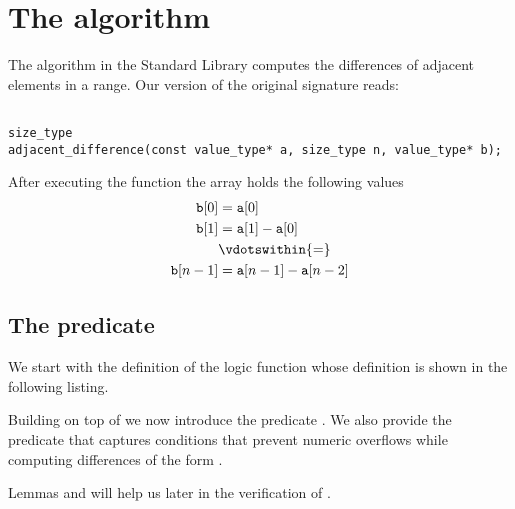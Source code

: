 
\section{The \adjacentdifference algorithm}

The \adjacentdifference algorithm in the \cxx Standard Library \cite[\S 29.8.11]{cxx-17-draft}
computes the differences of adjacent elements in a range.
%
Our version of the original signature reads:

\begin{lstlisting}[style=acsl-block]

size_type
adjacent_difference(const value_type* a, size_type n, value_type* b);
\end{lstlisting} 

After executing the function \adjacentdifference the array  holds the following values
\begin{align}
   \mathtt{b}[0] &= \mathtt{a}[0] \nonumber \\
   \mathtt{b}[1] &= \mathtt{a}[1] - \mathtt{a}[0] \nonumber \\
                 &\vdotswithin{=} \nonumber \\
   \mathtt{b}[n-1] &= \mathtt{a}[n-1] - \mathtt{a}[n-2] \nonumber \\
\end{align}

\subsection{The predicate \AdjacentDifference}

We start with the definition of the logic function \Difference whose definition
is shown in the following listing.



\clearpage 

Building on top of \Difference we now introduce the predicate \AdjacentDifference.
We also provide the predicate \AdjacentDifferenceBounds
that captures conditions that prevent numeric overflows
while computing differences of the form .



Lemmas  and 
will help us later in the verification of .

\clearpage

